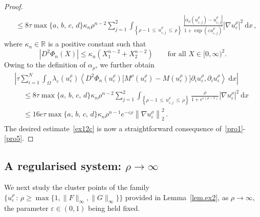 \documentclass[10pt]{amsart}
\theoremstyle{definition}\newtheorem{defi}[theo]{Definition}\newtheorem{rema}[theo]{Remark}\newtheorem{exam}[theo]{Example}\newtheorem{exem}[theo]{Example}\newtheorem{nota}[theo]{Notation}
\newcommand{\bbR}{\mathbb{R}}
\newcommand{\rmd}{\mathrm{d}}
\begin{document}
\begin{proof}
\begin{multline*}
\begin{aligned}
& \leq 8\tau \max\{a,\,b,\,c,\,d\}\kappa_n \rho^{n-2} \sum_{j=1}^2 \int_{\left\{\rho-1\,\leq\, u_{\varepsilon,j}^\rho\,\leq\,\rho\right\}} \frac{\left|\alpha_\rho\left(u_{\varepsilon,j}^\rho\right) - u_{\varepsilon,j}^\rho\right|}{1+\exp\left(\varepsilon u_{\varepsilon,j}^\rho\right)} \left|\nabla u_\varepsilon^\rho\right|^2 \ \rmd x\,,
\end{aligned}
\end{multline*}
where $\kappa_n\in\bbR$ is a positive constant such that
\begin{equation*}
\left|D^2\Phi_n(X)\right|\leq \kappa_n\left(X_1^{n-2}+X_2^{n-2}\right)\qquad\text{for all }X\in[0,\infty)^2.
\end{equation*}
Owing to the definition of $\alpha_\rho$, we further obtain
\begin{multline}\label{pro5}
\left| \tau \sum_{i=1}^N\int_\Omega \lambda_\varepsilon(u_\varepsilon^\rho) \left\langle D^2\Phi_n(u_\varepsilon^\rho) \big[M^\rho(u_\varepsilon^\rho) - M(u_\varepsilon^\rho)\big] \partial_i u_{\varepsilon}^\rho, \partial _i u_\varepsilon^\rho\right\rangle\ \rmd x\right| \\[1ex] 
\begin{aligned}
&\leq 8 \tau \max\{a,\,b,\,c,\,d\}\kappa_n \rho^{n-2} \sum_{j=1}^2 \int_{\left\{\rho-1\,\leq\,u_{\varepsilon,j}^\rho\,\leq\,\rho\right\}}\frac{\rho}{1+e^{\varepsilon(\rho-1)}} |\nabla u_\varepsilon^\rho|^2\ \rmd x\\[1ex]
&\leq 16e \tau \max\{a,\,b,\,c,\,d\}\kappa_n \rho^{n-1} e^{-\varepsilon\rho} \left\|\nabla u_\varepsilon^\rho\right\|_2^2\,.
\end{aligned}
\end{multline}
The desired estimate~\eqref{ex12c} is now a straightforward consequence of~\eqref{pro1}-\eqref{pro5}.
\end{proof}



\subsection{A regularised system: \texorpdfstring{$\rho\to\infty$}{rho to infty}}\label{sec2.3}



We next study the cluster points of the family~${\{u_{\varepsilon}^\rho\,:\, \rho\geq \max\{1,\|F\|_\infty,\|G\|_\infty\}\}}$ provided in Lemma~\ref{lem.ex2}, as $\rho\to\infty$, the parameter $\varepsilon\in (0,1)$ being held fixed.
\end{document}
